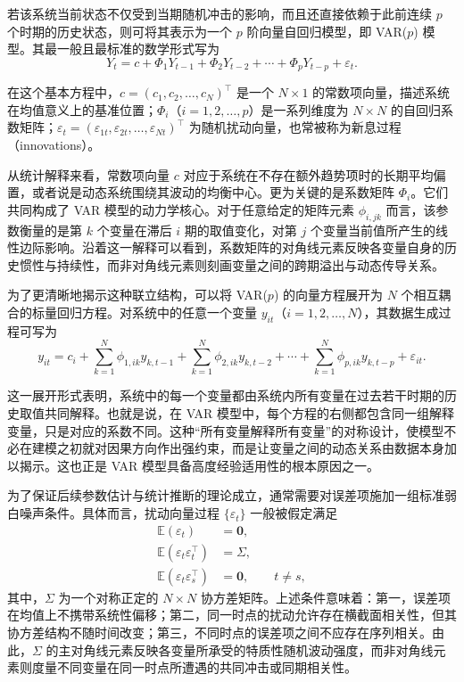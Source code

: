若该系统当前状态不仅受到当期随机冲击的影响，而且还直接依赖于此前连续 $p$ 个时期的历史状态，则可将其表示为一个 $p$ 阶向量自回归模型，即 VAR($p$) 模型。其最一般且最标准的数学形式写为
\begin{equation}\label{eq:varp}
Y_t = c + \Phi_1 Y_{t-1} + \Phi_2 Y_{t-2} + \cdots + \Phi_p Y_{t-p} + \varepsilon_t.
\end{equation}

在这个基本方程中，$c=(c_1,c_2,\dots,c_N)^\top$ 是一个 $N\times 1$ 的常数项向量，描述系统在均值意义上的基准位置；$\Phi_i$（$i=1,2,\dots,p$）是一系列维度为 $N\times N$ 的自回归系数矩阵；$\varepsilon_t=(\varepsilon_{1t},\varepsilon_{2t},\dots,\varepsilon_{Nt})^\top$ 为随机扰动向量，也常被称为新息过程（innovations）。

从统计解释来看，常数项向量 $c$ 对应于系统在不存在额外趋势项时的长期平均偏置，或者说是动态系统围绕其波动的均衡中心。更为关键的是系数矩阵 $\Phi_i$。它们共同构成了 VAR 模型的动力学核心。对于任意给定的矩阵元素 $\phi_{i,jk}$ 而言，该参数衡量的是第 $k$ 个变量在滞后 $i$ 期的取值变化，对第 $j$ 个变量当前值所产生的线性边际影响。沿着这一解释可以看到，系数矩阵的对角线元素反映各变量自身的历史惯性与持续性，而非对角线元素则刻画变量之间的跨期溢出与动态传导关系。

为了更清晰地揭示这种联立结构，可以将 VAR($p$) 的向量方程展开为 $N$ 个相互耦合的标量回归方程。对系统中的任意一个变量 $y_{it}$（$i=1,2,\dots,N$），其数据生成过程可写为
\begin{equation}
 y_{it} = c_i + \sum_{k=1}^{N}\phi_{1,ik}y_{k,t-1} + \sum_{k=1}^{N}\phi_{2,ik}y_{k,t-2} + \cdots + \sum_{k=1}^{N}\phi_{p,ik}y_{k,t-p} + \varepsilon_{it}.
\end{equation}

这一展开形式表明，系统中的每一个变量都由系统内所有变量在过去若干时期的历史取值共同解释。也就是说，在 VAR 模型中，每个方程的右侧都包含同一组解释变量，只是对应的系数不同。这种“所有变量解释所有变量”的对称设计，使模型不必在建模之初就对因果方向作出强约束，而是让变量之间的动态关系由数据本身加以揭示。这也正是 VAR 模型具备高度经验适用性的根本原因之一。

为了保证后续参数估计与统计推断的理论成立，通常需要对误差项施加一组标准弱白噪声条件。具体而言，扰动向量过程 $\{\varepsilon_t\}$ 一般被假定满足
\begin{align}
\mathbb{E}(\varepsilon_t) &= \bm{0},\\
\mathbb{E}(\varepsilon_t\varepsilon_t^\top) &= \Sigma,\\
\mathbb{E}(\varepsilon_t\varepsilon_s^\top) &= \bm{0}, \qquad t\neq s,
\end{align}
其中，$\Sigma$ 为一个对称正定的 $N\times N$ 协方差矩阵。上述条件意味着：第一，误差项在均值上不携带系统性偏移；第二，同一时点的扰动允许存在横截面相关性，但其协方差结构不随时间改变；第三，不同时点的误差项之间不应存在序列相关。由此，$\Sigma$ 的主对角线元素反映各变量所承受的特质性随机波动强度，而非对角线元素则度量不同变量在同一时点所遭遇的共同冲击或同期相关性。

